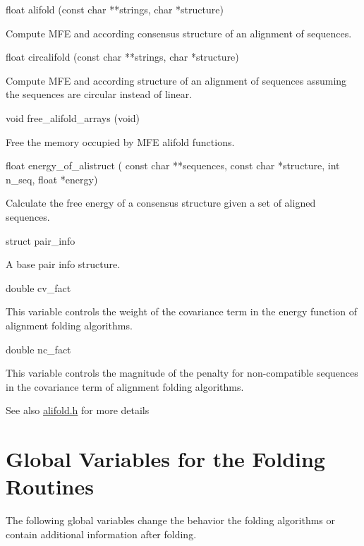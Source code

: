 \begin{DoxyVerb}
float  alifold (const char **strings,
                char *structure)
\end{DoxyVerb}
 Compute MFE and according consensus structure of an alignment of sequences. 

\begin{DoxyVerb}
float  circalifold (const char **strings,
                    char *structure)
\end{DoxyVerb}
 Compute MFE and according structure of an alignment of sequences assuming the sequences are circular instead of linear. 

\begin{DoxyVerb}
void    free_alifold_arrays (void)
\end{DoxyVerb}
 Free the memory occupied by MFE alifold functions. 

\begin{DoxyVerb}
float   energy_of_alistruct (
            const char **sequences,
            const char *structure,
            int n_seq,
            float *energy)
\end{DoxyVerb}
 Calculate the free energy of a consensus structure given a set of aligned sequences. 

\begin{DoxyVerb}
struct pair_info
\end{DoxyVerb}
 A base pair info structure. 

\begin{DoxyVerb}
double  cv_fact
\end{DoxyVerb}
 This variable controls the weight of the covariance term in the energy function of alignment folding algorithms. 

\begin{DoxyVerb}
double  nc_fact
\end{DoxyVerb}
 This variable controls the magnitude of the penalty for non-\/compatible sequences in the covariance term of alignment folding algorithms. 

\begin{DoxySeeAlso}{See also}
\hyperlink{alifold_8h}{alifold.h} for more details
\end{DoxySeeAlso}
\hypertarget{mp__fold_mp_Fold_Vars}{}\section{Global Variables for the Folding Routines}\label{mp__fold_mp_Fold_Vars}
The following global variables change the behavior the folding algorithms or contain additional information after folding.

